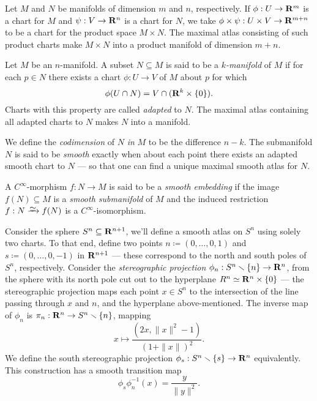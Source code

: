 \begin{definition}
    \label{def:product-manifold}
    Let \(M\) and \(N\) be manifolds of dimension \(m\) and \(n\), respectively. If
    \(\phi: U \to \mathbf{R}^m\) is a chart for \(M\) and \(\psi: V \to \mathbf{R}^n\) is a chart
    for \(N\), we take \(\phi \times \psi: U \times V \to \mathbf{R}^{m + n}\) to be a chart
    for the product space \(M \times N\). The maximal atlas consisting of such
    product charts make \(M \times N\) into a product manifold of dimension
    \(m + n\).
\end{definition}

\begin{definition}[Submanifold]
    \label{def:submanifold}
    Let \(M\) be an \(n\)-manifold. A subset \(N \subseteq M\) is said to be a
    \emph{\(k\)-manifold} of \(M\) if for each \(p \in N\) there exists a chart
    \(\phi: U \to V\) of \(M\) about \(p\) for which
    \[
        \phi(U \cap N) = V \cap (\mathbf{R}^k \times \{0\}).
    \]
    Charts with this property are called \emph{adapted} to \(N\). The maximal atlas
    containing all adapted charts to \(N\) makes \(N\) into a manifold.

    We define the \emph{codimension} of \(N\) \emph{in} \(M\) to be the difference
    \(n - k\). The submanifold \(N\) is said to be \emph{smooth} exactly when about
    each point there exists an adapted smooth chart to \(N\) --- so that one can
    find a unique maximal smooth atlas for \(N\).
\end{definition}

\begin{definition}
    \label{def:smooth-embedding}
    A \(C^{\infty}\)-morphism \(f: N \to M\) is said to be a \emph{smooth embedding}
    if the image \(f(N) \subseteq M\) is a \emph{smooth submanifold} of \(M\) and
    the induced restriction \(f: N \isoto f(N)\) is a \(C^{\infty}\)-isomorphism.
\end{definition}

\begin{example}[Sphere]
    \label{exp:sphere-smooth-manifold}
    Consider the sphere \(S^n \subseteq \mathbf{R}^{n+1}\), we'll define a smooth atlas on
    \(S^n\) using solely two charts. To that end, define two points
    \(n \coloneq (0, \dots, 0, 1)\) and \(s \coloneq (0, \dots, 0, -1)\) in
    \(\mathbf{R}^{n+1}\) --- these correspond to the north and south poles of \(S^n\),
    respectively. Consider the \emph{stereographic projection}
    \(\phi_n: S^n \smallsetminus \{n\} \to \mathbf{R}^n\), from the sphere with its north pole
    cut out to the hyperplane \(R^n \simeq \mathbf{R}^n \times \{0\}\) --- the stereographic
    projection maps each point \(x \in S^n\) to the intersection of the line passing
    through \(x\) and \(n\), and the hyperplane above-mentioned. The inverse map of
    \(\phi_n\) is \(\pi_n: \mathbf{R}^n \to S^n \smallsetminus \{n\}\), mapping
    \[
        x \longmapsto \frac{(2 x, \| x \|^2 - 1)}{(1 + \| x \|)^2}.
    \]
    We define the south stereographic projection \(\phi_s: S^n \smallsetminus \{s\} \to
    \mathbf{R}^n\) equivalently. This construction has a smooth transition map
    \[
        \phi_s \phi_n^{-1}(x) = \frac{y}{\| y \|^2}.
    \]
\end{example}



